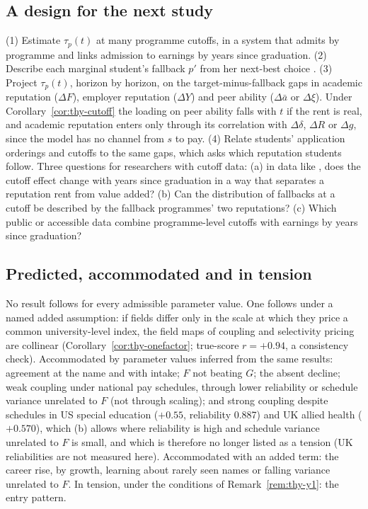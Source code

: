 \subsection{A design for the next study}\label{app:thy:design}

(1) Estimate $\tau_p(t)$ at many programme cutoffs, in a system that admits by programme and links admission to
earnings by years since graduation. (2) Describe each marginal student's fallback $p'$ from her next-best choice
\citep{kirkeboen2016field}. (3) Project $\tau_p(t)$, horizon by horizon, on the target-minus-fallback gaps in academic
reputation ($\Delta F$), employer reputation ($\Delta Y$) and peer ability ($\Delta\bar a$ or $\Delta\xi$). Under
Corollary~\ref{cor:thy-cutoff} the loading on peer ability falls with $t$ if the rent is real, and academic
reputation enters only through its correlation with $\Delta\delta$, $\Delta R$ or $\Delta g$, since the model has no
channel from $s$ to pay. (4) Relate students' application orderings and cutoffs to the same gaps, which asks which
reputation students follow. Three questions for researchers with cutoff data: (a) in data like
\citet{anelli2020returns}, does the cutoff effect change with years since graduation in a way that separates a
reputation rent from value added? (b) Can the distribution of fallbacks at a cutoff be described by the fallback
programmes' two reputations? (c) Which public or accessible data combine programme-level cutoffs with earnings by
years since graduation?

\subsection{Predicted, accommodated and in tension}\label{app:thy:ledger}

No result follows for every admissible parameter value. One follows under a named added assumption: if fields differ
only in the scale at which they price a common university-level index, the field maps of coupling and selectivity
pricing are collinear (Corollary~\ref{cor:thy-onefactor}; true-score $r=+0.94$, a consistency check). Accommodated by
parameter values inferred from the same results: agreement at the name and with intake; $F$ not beating $G$; the
absent decline; weak coupling under national pay schedules, through lower reliability or schedule variance unrelated
to $F$ (not through scaling); and strong coupling despite schedules in US special education ($+0.55$, reliability
0.887) and UK allied health ($+0.570$), which (b) allows where reliability is high and schedule variance unrelated to
$F$ is small, and which is therefore no longer listed as a tension (UK reliabilities are not measured here).
Accommodated with an added term: the career rise, by growth, learning about rarely seen names or falling variance
unrelated to $F$. In tension, under the conditions of Remark~\ref{rem:thy-y1}: the entry pattern.

